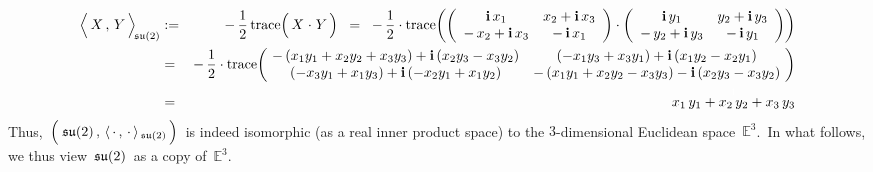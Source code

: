 \begin{eqnarray*}
\left\langle\,
	\overset{{\color{white}.}}{X}
	\, , \,
	Y
	\,\right\rangle_{\!\su(2)}
& := &
	-\,\dfrac{1}{2}\,
	\trace\!\left(\,X \overset{{\color{white}1}}{\cdot} Y\,\right)
\;\; = \;\;
	-\,\dfrac{1}{2}\cdot\trace\!\left(
		\left(\begin{array}{cc}
			\i\,x_{1} & x_{2} + \i\,x_{3}
			\\
			- \, x_{2} + \i\,x_{3} & -\,\i\,x_{1}
			\end{array}\right)
		\cdot
		\left(\begin{array}{cc}
			\i\,y_{1} & y_{2} + \i\,y_{3}
			\\
			- \, y_{2} + \i\,y_{3} & -\,\i\,y_{1}
			\end{array}\right)
		\right)
\\
& = &
	-\,\dfrac{1}{2}\cdot\trace\!\left(\!
		\begin{array}{cc}
			-\,(x_{1}y_{1} + x_{2}y_{2} + x_{3}y_{3}) + \i\,(x_{2}y_{3}-x_{3}y_{2}) & (-x_{1}y_{3}+x_{3}y_{1}) + \i\,(x_{1}y_{2} - x_{2}y_{1})
			\\
			(-x_{3}y_{1}+x_{1}y_{3}) + \i\,(-x_{2}y_{1}+x_{1}y_{2}) & -\,(x_{1}y_{1} + x_{2}y_{2} - x_{3}y_{3}) - \i\,(x_{2}y_{3}-x_{3}y_{2})
			\end{array}
		\!\right)
\\
& = &
	\overset{{\color{white}1}}{x_{1}\,y_{1} + x_{2}\,y_{2} + x_{3}\,y_{3}}
\end{eqnarray*}
Thus,
\,$\left(\;\overset{{\color{white}.}}{\su(2)}\,,\,\langle\,\cdot\,,\,\cdot\,\rangle_{\,\su(2)}\,\right)$\,
is indeed isomorphic (as a real inner product space) to the $3$-dimensional Euclidean space \,$\mathbb{E}^{3}$.\,
In what follows, we thus view \,$\mathfrak{su}(2)$\, as a copy of \,$\mathbb{E}^{3}$.\,


